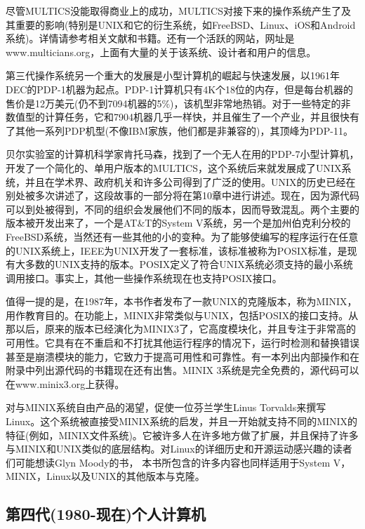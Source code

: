 	尽管MULTICS没能取得商业上的成功，MULTICS对接下来的操作系统产生了及其重要的影响(特别是UNIX和它的衍生系统，如FreeBSD、Linux、iOS和Android系统)。详情请参考相关文献和书籍。还有一个活跃的网站，网址是www.multicians.org，上面有大量的关于该系统、设计者和用户的信息。
	
	第三代操作系统另一个重大的发展是小型计算机的崛起与快速发展，以1961年DEC的PDP-1机器为起点。PDP-1计算机只有4K个18位的内存，但是每台机器的售价是12万美元(仍不到7094机器的5\%)，该机型非常地热销。对于一些特定的非数值型的计算任务，它和7904机器几乎一样快，并且催生了一个产业，并且很快有了其他一系列PDP机型(不像IBM家族，他们都是非兼容的)，其顶峰为PDP-11。
	
	贝尔实验室的计算机科学家肯托马森，找到了一个无人在用的PDP-7小型计算机，开发了一个简化的、单用户版本的MULTICS，这个系统后来就发展成了UNIX系统，并且在学术界、政府机关和许多公司得到了广泛的使用。UNIX的历史已经在别处被多次讲述了，这段故事的一部分将在第10章中进行讲述。现在，因为源代码可以到处被得到，不同的组织会发展他们不同的版本，因而导致混乱。两个主要的版本被开发出来了，一个是AT\&T的System V系统，另一个是加州伯克利分校的FreeBSD系统，当然还有一些其他的小的变种。为了能够使编写的程序运行在任意的UNIX系统上，IEEE为UNIX开发了一套标准，该标准被称为POSIX标准，是现有大多数的UNIX支持的版本。POSIX定义了符合UNIX系统必须支持的最小系统调用接口。事实上，其他一些操作系统现在也支持POSIX接口。
	
	值得一提的是，在1987年，本书作者发布了一款UNIX的克隆版本，称为MINIX，用作教育目的。在功能上，MINIX非常类似与UNIX，包括POSIX的接口支持。从那以后，原来的版本已经演化为MINIX3了，它高度模块化，并且专注于非常高的可用性。它具有在不重启和不打扰其他运行程序的情况下，运行时检测和替换错误甚至是崩溃模块的能力，它致力于提高可用性和可靠性。有一本列出内部操作和在附录中列出源代码的书籍现在还有出售。MINIX 3系统是完全免费的，源代码可以在www.minix3.org上获得。
	
	对与MINIX系统自由产品的渴望，促使一位芬兰学生Linus Torvalds来撰写Linux。这个系统被直接受MINIX系统的启发，并且一开始就支持不同的MINIX的特征(例如，MINIX文件系统)。它被许多人在许多地方做了扩展，并且保持了许多与MINIX和UNIX类似的底层结构。对Linux的详细历史和开源运动感兴趣的读者们可能想读Glyn Moody的书，
	本书所包含的许多内容也同样适用于System V，MINIX，Linux以及UNIX的其他版本与克隆。

\subsection{第四代(1980-现在)个人计算机}

